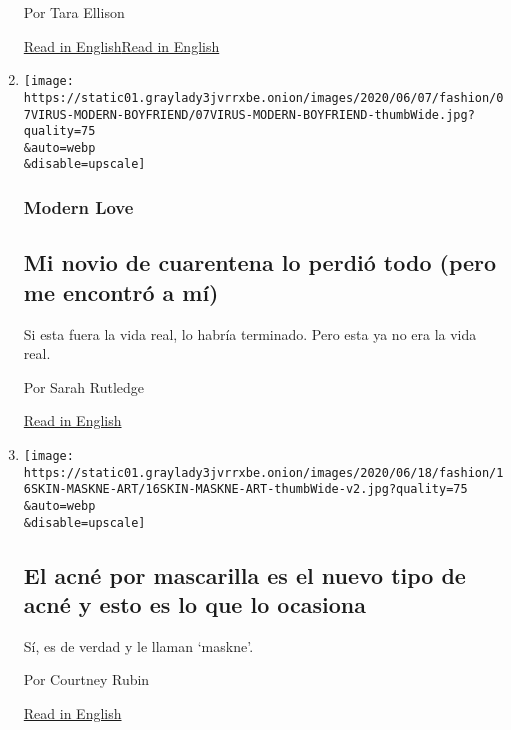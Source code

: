 \begin{enumerate}
  Por Tara Ellison

  \href{https://www.nytimes3xbfgragh.onion/2020/06/19/style/modern-love-coronavirus-missing-father.html}{Read
  in
  English}\href{https://www.nytimes3xbfgragh.onion/2020/06/19/style/modern-love-coronavirus-missing-father.html}{Read
  in English}
\item
  \href{/es/2020/06/21/espanol/estilos-de-vida/novio-cuarentena-coronavirus.html}{}

  \texttt{[image: https://static01.graylady3jvrrxbe.onion/images/2020/06/07/fashion/07VIRUS-MODERN-BOYFRIEND/07VIRUS-MODERN-BOYFRIEND-thumbWide.jpg?quality=75\\\&auto=webp\\\&disable=upscale]}

  \hypertarget{modern-love-4}{%
  \subsubsection{Modern Love}\label{modern-love-4}}

  \hypertarget{mi-novio-de-cuarentena-lo-perdiuxf3-todo-pero-me-encontruxf3-a-muxed}{%
  \subsection{Mi novio de cuarentena lo perdió todo (pero me encontró a
  mí)}\label{mi-novio-de-cuarentena-lo-perdiuxf3-todo-pero-me-encontruxf3-a-muxed}}

  Si esta fuera la vida real, lo habría terminado. Pero esta ya no era
  la vida real.

  Por Sarah Rutledge

  \href{https://www.nytimes3xbfgragh.onion/2020/06/05/style/modern-love-coronavirus-quarantine-boyfriend-lost-everything.html}{Read
  in English}
\item
  \href{/es/2020/06/20/espanol/estilos-de-vida/mascarilla-acne-maskne.html}{}

  \texttt{[image: https://static01.graylady3jvrrxbe.onion/images/2020/06/18/fashion/16SKIN-MASKNE-ART/16SKIN-MASKNE-ART-thumbWide-v2.jpg?quality=75\\\&auto=webp\\\&disable=upscale]}

  \hypertarget{el-acnuxe9-por-mascarilla-es-el-nuevo-tipo-de-acnuxe9-y-esto-es-lo-que-lo-ocasiona}{%
  \subsection{El acné por mascarilla es el nuevo tipo de acné y esto es
  lo que lo
  ocasiona}\label{el-acnuxe9-por-mascarilla-es-el-nuevo-tipo-de-acnuxe9-y-esto-es-lo-que-lo-ocasiona}}

  Sí, es de verdad y le llaman `maskne'.

  Por Courtney Rubin

  \href{https://www.nytimes3xbfgragh.onion/article/maskne-acne.html}{Read
  in English}
\end{enumerate}

